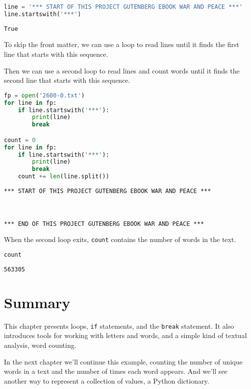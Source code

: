 \begin{lstlisting}[language=Python,style=source]
line = '*** START OF THIS PROJECT GUTENBERG EBOOK WAR AND PEACE ***'
line.startswith('***')
\end{lstlisting}

\begin{lstlisting}[style=output]
True
\end{lstlisting}

To skip the front matter, we can use a loop to read lines until it finds
the first line that starts with this sequence.

Then we can use a second loop to read lines and count words until it
finds the second line that starts with this sequence.

\begin{lstlisting}[language=Python,style=source]
fp = open('2600-0.txt')
for line in fp:
    if line.startswith('***'):
        print(line)
        break

count = 0
for line in fp:
    if line.startswith('***'):
        print(line)
        break
    count += len(line.split())
\end{lstlisting}

\begin{lstlisting}[style=output]
*** START OF THIS PROJECT GUTENBERG EBOOK WAR AND PEACE ***



*** END OF THIS PROJECT GUTENBERG EBOOK WAR AND PEACE ***
\end{lstlisting}

When the second loop exits, \passthrough{\lstinline!count!} contains the
number of words in the text.

\begin{lstlisting}[language=Python,style=source]
count
\end{lstlisting}

\begin{lstlisting}[style=output]
563305
\end{lstlisting}

\section{Summary}\label{summary}

This chapter presents loops, \passthrough{\lstinline!if!} statements,
and the \passthrough{\lstinline!break!} statement. It also introduces
tools for working with letters and words, and a simple kind of textual
analysis, word counting.

In the next chapter we'll continue this example, counting the number of
unique words in a text and the number of times each word appears. And
we'll see another way to represent a collection of values, a Python
dictionary.

